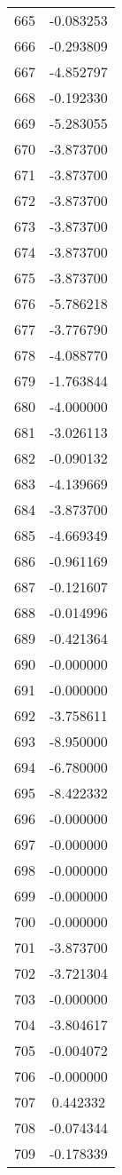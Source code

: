 \documentclass[12pt]{article}
\begin{document}
\begin{longtable}{@{}cc@{}}
665 & -0.083253 \\
666 & -0.293809 \\
667 & -4.852797 \\
668 & -0.192330 \\
669 & -5.283055 \\
670 & -3.873700 \\
671 & -3.873700 \\
672 & -3.873700 \\
673 & -3.873700 \\
674 & -3.873700 \\
675 & -3.873700 \\
676 & -5.786218 \\
677 & -3.776790 \\
678 & -4.088770 \\
679 & -1.763844 \\
680 & -4.000000 \\
681 & -3.026113 \\
682 & -0.090132 \\
683 & -4.139669 \\
684 & -3.873700 \\
685 & -4.669349 \\
686 & -0.961169 \\
687 & -0.121607 \\
688 & -0.014996 \\
689 & -0.421364 \\
690 & -0.000000 \\
691 & -0.000000 \\
692 & -3.758611 \\
693 & -8.950000 \\
694 & -6.780000 \\
695 & -8.422332 \\
696 & -0.000000 \\
697 & -0.000000 \\
698 & -0.000000 \\
699 & -0.000000 \\
700 & -0.000000 \\
701 & -3.873700 \\
702 & -3.721304 \\
703 & -0.000000 \\
704 & -3.804617 \\
705 & -0.004072 \\
706 & -0.000000 \\
707 & 0.442332 \\
708 & -0.074344 \\
709 & -0.178339 \\

\end{longtable}
\end{document}
